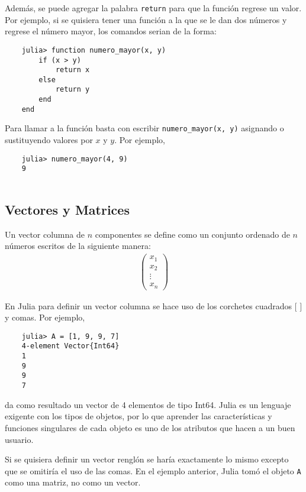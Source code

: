 Además, se puede agregar la palabra \texttt{return} para que la función regrese un valor. Por ejemplo, si se quisiera tener una función a la que se le dan dos números y regrese el número mayor, los comandos serian de la forma:

\begin{verbatim}
	julia> function numero_mayor(x, y)
		if (x > y)
			return x
		else
			return y
		end
	end
\end{verbatim}


Para llamar a la función basta con escribir \texttt{numero\_mayor(x, y)} asignando o sustituyendo valores por $x$ y $y$. Por ejemplo,

\begin{verbatim}
	julia> numero_mayor(4, 9)
	9
	
\end{verbatim}

\subsection{Vectores y Matrices}

Un vector columna de $n$ componentes se define como un conjunto ordenado de $n$ números escritos de la siguiente manera:
\begin{equation*}
    \begin{aligned}
    \begin{pmatrix}
    x_1 \\ 
    x_2 \\
    \vdots \\
    x_n
    \end{pmatrix} 
    \end{aligned}
\end{equation*}

En \textsf{Julia} para definir un vector columna se hace uso de los corchetes cuadrados $[$ $]$ y comas. Por ejemplo, 

\begin{verbatim}
	julia> A = [1, 9, 9, 7]
	4-element Vector{Int64}
	1
	9
	9
	7
\end{verbatim}

\noindent da como resultado un vector de 4 elementos de tipo Int64. \textsf{Julia} es un lenguaje exigente con los tipos de objetos, por lo que aprender las características y funciones singulares de cada objeto es uno de los atributos que hacen a un buen usuario. 

Si se quisiera definir un vector renglón se haría exactamente lo mismo excepto que se omitiría el uso de las comas. En el ejemplo anterior, \textsf{Julia} tomó el objeto \texttt{A} como una matriz, no como un vector. 

